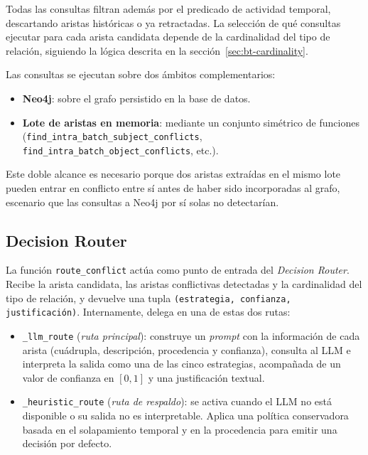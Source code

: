 Todas las consultas filtran además por el predicado de actividad temporal, descartando aristas históricas o ya retractadas. La selección de qué consultas ejecutar para cada arista candidata depende de la cardinalidad del tipo de relación, siguiendo la lógica descrita en la sección~\ref{sec:bt-cardinality}.

Las consultas se ejecutan sobre dos ámbitos complementarios:

\begin{itemize}
  \item \textbf{Neo4j}: sobre el grafo persistido en la base de datos.
  \item \textbf{Lote de aristas en memoria}: mediante un conjunto simétrico de funciones (\texttt{find\_intra\_batch\_subject\_conflicts}, \texttt{find\_intra\_batch\_object\_conflicts}, etc.).
\end{itemize}

Este doble alcance es necesario porque dos aristas extraídas en el mismo lote pueden entrar en conflicto entre sí antes de haber sido incorporadas al grafo, escenario que las consultas a Neo4j por sí solas no detectarían.

\subsection{Decision Router}

La función \texttt{route\_conflict} actúa como punto de entrada del \emph{Decision Router}. Recibe la arista candidata, las aristas conflictivas detectadas y la cardinalidad del tipo de relación, y devuelve una tupla \texttt{(estrategia, confianza, justificación)}. Internamente, delega en una de estas dos rutas:

\begin{itemize}
  \item \texttt{\_llm\_route} (\emph{ruta principal}): construye un \emph{prompt} con la información de cada arista (cuádrupla, descripción, procedencia y confianza), consulta al LLM e interpreta la salida como una de las cinco estrategias, acompañada de un valor de confianza en $[0, 1]$ y una justificación textual.
  \item \texttt{\_heuristic\_route} (\emph{ruta de respaldo}): se activa cuando el LLM no está disponible o su salida no es interpretable. Aplica una política conservadora basada en el solapamiento temporal y en la procedencia para emitir una decisión por defecto.
\end{itemize}

